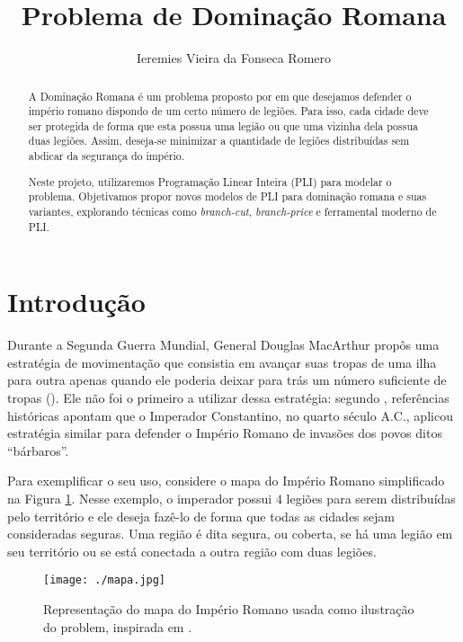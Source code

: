 \documentclass[11pt]{article}
\author{Ieremies Vieira da Fonseca Romero}
\date{}
\title{Problema de Dominação Romana}
\begin{document}
\maketitle
\begin{abstract}
A Dominação Romana é um problema proposto por \textcite{Stewart1999DefendRomanEmpire} em que desejamos defender o império romano dispondo de um certo número de legiões.
Para isso, cada cidade deve ser protegida de forma que esta possua uma legião ou que uma vizinha dela possua duas legiões.
Assim, deseja-se minimizar a quantidade de legiões distribuídas sem abdicar da segurança do império.

Neste projeto, utilizaremos Programação Linear Inteira (PLI) para modelar o problema.
Objetivamos propor novos modelos de PLI para dominação romana e suas variantes, explorando técnicas como \emph{branch-cut}, \emph{branch-price} e ferramental moderno de PLI.
\end{abstract}

\section{Introdução}
\label{sec:orge94aeb2}
Durante a Segunda Guerra Mundial, General Douglas MacArthur propôs uma estratégia de movimentação que consistia em avançar suas tropas de uma ilha para outra apenas quando ele poderia deixar para trás um número suficiente de tropas (\autocite{Stewart1999DefendRomanEmpire}).
Ele não foi o primeiro a utilizar dessa estratégia: segundo \textcite{Stewart1999DefendRomanEmpire}, referências históricas apontam que o Imperador Constantino, no quarto século A.C., aplicou estratégia similar para defender o Império Romano de invasões dos povos ditos ``bárbaros''.

Para exemplificar o seu uso, considere o mapa do Império Romano simplificado na Figura \ref{fig:mapa}.
Nesse exemplo, o imperador possui \(4\) legiões para serem distribuídas pelo território e ele deseja fazê-lo de forma que todas as cidades sejam consideradas seguras.
Uma região é dita segura, ou coberta, se há uma legião em seu território ou se está conectada a outra região com duas legiões.

\begin{figure}[htbp]
\centering
\texttt{[image: ./mapa.jpg]}
\caption{\label{fig:mapa}Representação do mapa do Império Romano usada como ilustração do problem, inspirada em \textcite{Stewart1999DefendRomanEmpire}.}
\end{figure}
\end{document}

